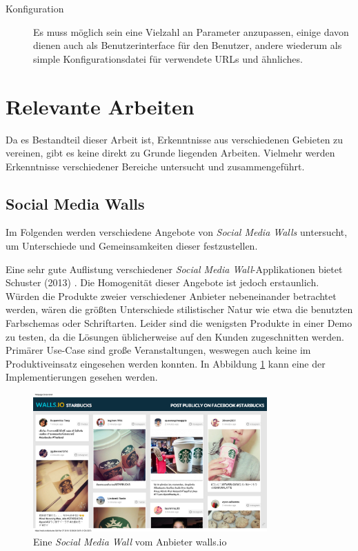 \documentclass[12pt,twoside]{book}
\begin{document}
\begin{description}
\item[Konfiguration]
  Es muss möglich sein eine Vielzahl an Parameter anzupassen, einige davon dienen auch als Benutzerinterface für den Benutzer, andere wiederum als simple Konfigurationsdatei für verwendete URLs und ähnliches.

\end{description}

\section{Relevante Arbeiten}

Da es Bestandteil dieser Arbeit ist, Erkenntnisse aus verschiedenen Gebieten zu vereinen, gibt es keine direkt zu Grunde liegenden Arbeiten. Vielmehr werden Erkenntnisse verschiedener Bereiche untersucht und zusammengeführt.

\subsection{Social Media Walls}

Im Folgenden werden verschiedene Angebote von \textit{Social Media Walls} untersucht, um Unterschiede und Gemeinsamkeiten dieser festzustellen.

Eine sehr gute Auflistung verschiedener \textit{Social Media Wall}-Applikationen bietet Schuster (2013) \citep{hofram}. Die Homogenität dieser Angebote ist jedoch erstaunlich. Würden die Produkte zweier verschiedener Anbieter nebeneinander betrachtet werden, wären die größten Unterschiede stilistischer Natur wie etwa die benutzten Farbschemas oder Schriftarten. Leider sind die wenigsten Produkte in einer Demo zu testen, da die Lösungen üblicherweise auf den Kunden zugeschnitten werden. Primärer Use-Case sind große Veranstaltungen, weswegen auch keine im Produktiveinsatz eingesehen werden konnten. In Abbildung \ref{fig:socialwall} kann eine der Implementierungen gesehen werden.\\

\begin{figure}[htbp]
    \centering
    \includegraphics[width=0.8\textwidth]{images/Starbucks.png}
    \caption{Eine \textit{Social Media Wall} vom Anbieter walls.io \cite{wallsio}}\label{fig:socialwall}
\end{figure}
\end{document}
